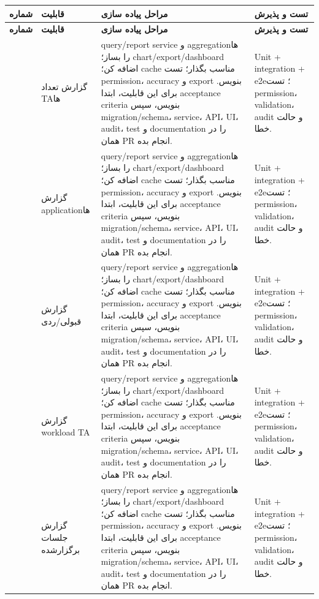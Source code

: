 \documentclass[11pt,a4paper]{article}
\begin{document}
\begin{longtable}{|>{\raggedleft\arraybackslash}p{}|>{\raggedleft\arraybackslash}p{}|>{\raggedleft\arraybackslash}p{}|>{\raggedleft\arraybackslash}p{}|}
\hline
\textbf{شماره} & \textbf{قابلیت} & \textbf{مراحل پیاده سازی} & \textbf{تست و پذیرش} \\\hline
\endfirsthead
\hline
\textbf{شماره} & \textbf{قابلیت} & \textbf{مراحل پیاده سازی} & \textbf{تست و پذیرش} \\\hline
\endhead
241 & گزارش تعداد TAها & query/report service و aggregationها را بساز؛ chart/export/dashboard اضافه کن؛ cache مناسب بگذار؛ تست permission، accuracy و export بنویس. برای این قابلیت، ابتدا acceptance criteria بنویس، سپس migration/schema، service، API، UI، audit، test و documentation را در همان PR انجام بده. & Unit + integration + e2e؛ تست permission، validation، audit و حالت خطا. \\ \hline
242 & گزارش applicationها & query/report service و aggregationها را بساز؛ chart/export/dashboard اضافه کن؛ cache مناسب بگذار؛ تست permission، accuracy و export بنویس. برای این قابلیت، ابتدا acceptance criteria بنویس، سپس migration/schema، service، API، UI، audit، test و documentation را در همان PR انجام بده. & Unit + integration + e2e؛ تست permission، validation، audit و حالت خطا. \\ \hline
243 & گزارش قبولی/ردی & query/report service و aggregationها را بساز؛ chart/export/dashboard اضافه کن؛ cache مناسب بگذار؛ تست permission، accuracy و export بنویس. برای این قابلیت، ابتدا acceptance criteria بنویس، سپس migration/schema، service، API، UI، audit، test و documentation را در همان PR انجام بده. & Unit + integration + e2e؛ تست permission، validation، audit و حالت خطا. \\ \hline
244 & گزارش workload TA & query/report service و aggregationها را بساز؛ chart/export/dashboard اضافه کن؛ cache مناسب بگذار؛ تست permission، accuracy و export بنویس. برای این قابلیت، ابتدا acceptance criteria بنویس، سپس migration/schema، service، API، UI، audit، test و documentation را در همان PR انجام بده. & Unit + integration + e2e؛ تست permission، validation، audit و حالت خطا. \\ \hline
245 & گزارش جلسات برگزارشده & query/report service و aggregationها را بساز؛ chart/export/dashboard اضافه کن؛ cache مناسب بگذار؛ تست permission، accuracy و export بنویس. برای این قابلیت، ابتدا acceptance criteria بنویس، سپس migration/schema، service، API، UI، audit، test و documentation را در همان PR انجام بده. & Unit + integration + e2e؛ تست permission، validation، audit و حالت خطا. \\ \hline

\end{longtable}
\end{document}
